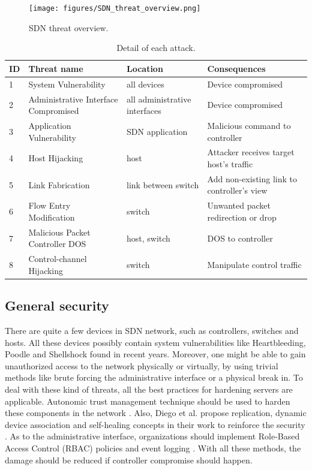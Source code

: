 \begin{figure}[H]
\begin{center} 
\texttt{[image: figures/SDN\_threat\_overview.png]}
\end{center}
\caption{SDN threat overview.}
\label{SND_threat_overview}
\end{figure}

\begin{table}[H]
\centering
\caption{Detail of each attack.}
\begin{tabular}{|l|p{4cm}|p{3.2cm}|p{5cm}|}
\hline ID & Threat name	& Location & Consequences \\
\hline
\hline 1 & System Vulnerability & all devices & Device compromised\\
\hline 2 & Administrative Interface Compromised & all administrative interfaces & Device compromised \\
\hline 3 & Application Vulnerability & SDN application & Malicious command to controller \\
\hline 4 & Host Hijacking & host & Attacker receives target host's traffic \\
\hline 5 & Link Fabrication & link between switch & Add non-existing link to controller's view \\
\hline 6 & Flow Entry Modification & switch & Unwanted packet redirection or drop \\
\hline 7 & Malicious Packet Controller DOS  & host, switch & DOS to controller \\
\hline 8 & Control-channel Hijacking & switch & Manipulate control traffic \\
\hline 
\end{tabular}
\label{table:sdn_threats}
\end{table}

\subsection{General security}
There are quite a few devices in SDN network, such as controllers, switches and hosts. All these devices  possibly contain system vulnerabilities like Heartbleeding, Poodle and Shellshock \cite{HB,POODLE,SHELLSHOCK} found in recent years. Moreover, one might be able to gain unauthorized access to the network physically or virtually, by using trivial methods like brute forcing the administrative interface or a physical break in. To deal with these kind of threats, all the best practices for hardening servers are applicable. Autonomic trust management technique should be used to harden these components in the network \cite{YZP11}. Also, Diego et al. propose replication, dynamic device association and self-healing concepts in their work to reinforce the security \cite{KDFRV13}. As to the administrative interface, organizations should implement Role-Based Access Control (RBAC) policies and event logging \cite{FFR09}. With all these methods, the damage should be reduced if controller compromise should happen.


